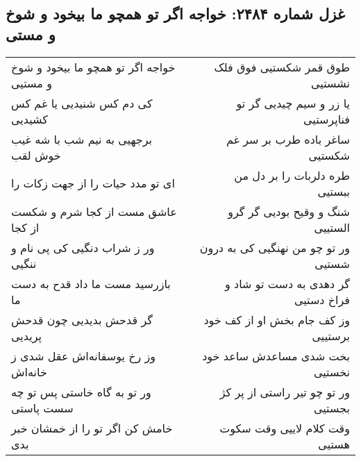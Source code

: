 \begin{center}
\section*{غزل شماره ۲۴۸۴: خواجه اگر تو همچو ما بیخود و شوخ و مستی}
\label{sec:2484}
\begin{longtable}{l p{0.5cm} r}
خواجه اگر تو همچو ما بیخود و شوخ و مستیی
&&
طوق قمر شکستیی فوق فلک نشستیی
\\
کی دم کس شنیدیی یا غم کس کشیدیی
&&
یا زر و سیم چیدیی گر تو فناپرستیی
\\
برجهیی به نیم شب با شه غیب خوش لقب
&&
ساغر باده طرب بر سر غم شکستیی
\\
ای تو مدد حیات را از جهت زکات را
&&
طره دلربات را بر دل من ببستیی
\\
عاشق مست از کجا شرم و شکست از کجا
&&
شنگ و وقیح بودیی گر گرو الستییی
\\
ور ز شراب دنگیی کی پی نام و ننگیی
&&
ور تو چو من نهنگیی کی به درون شستیی
\\
بازرسید مست ما داد قدح به دست ما
&&
گر دهدی به دست تو شاد و فراخ دستیی
\\
گر قدحش بدیدیی چون قدحش پریدیی
&&
وز کف جام بخش او از کف خود برستییی
\\
وز رخ یوسفانه‌اش عقل شدی ز خانه‌اش
&&
بخت شدی مساعدش ساعد خود نخستیی
\\
ور تو به گاه خاستی پس تو چه سست پاستی
&&
ور تو چو تیر راستی از پر کژ بجستیی
\\
خامش کن اگر تو را از خمشان خبر بدی
&&
وقت کلام لاییی وقت سکوت هستیی
\\
\end{longtable}
\end{center}
